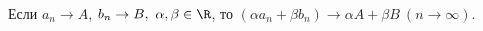 
Если $a_n\to A$, $b_n\to B,\ \alpha,\beta\in\R$, то $(\alpha a_n+\beta b_n)\to \alpha A+\beta B\ (n\to \infty)$.
